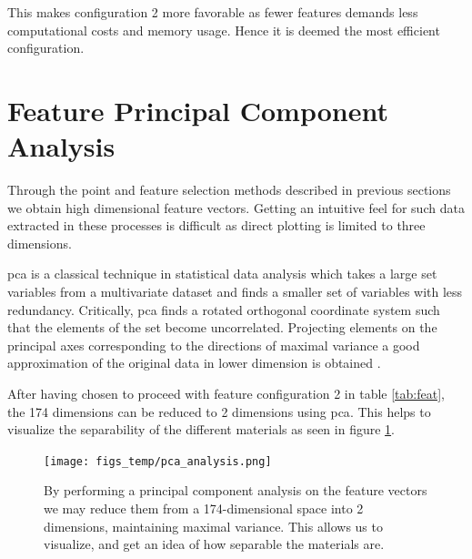 This makes configuration 2 more favorable as fewer features demands less computational costs and memory usage. Hence it is deemed the most efficient configuration.


\section{Feature Principal Component Analysis}

Through the point and feature selection methods described in previous sections we obtain high dimensional feature vectors. Getting an intuitive feel for such data extracted in these processes is difficult as direct plotting is limited to three dimensions. 

\gls{pca} is  a classical technique in statistical data analysis which takes a large set variables from a multivariate dataset and finds a smaller set of variables with less redundancy. Critically, \gls{pca} finds a rotated orthogonal coordinate system such that the elements of the set become uncorrelated. Projecting elements on the principal axes corresponding to the directions of maximal variance a good approximation of the original data in lower dimension is obtained \citep{hyvasrinen_karhunen_oja_2004}.

After having chosen to proceed with feature configuration 2 in table \ref{tab:feat}, the 174 dimensions can be reduced to 2 dimensions using \gls{pca}. This helps to visualize the separability of the different materials as seen in figure \ref{fig:pca}.

\begin{figure}[h]
	\centering
	\texttt{[image: figs\_temp/pca\_analysis.png]}
	\caption{By performing a principal component analysis on the feature vectors we may reduce them from a 174-dimensional space into 2 dimensions, maintaining maximal variance. This allows us to visualize, and get an idea of how separable the materials are.}
	\label{fig:pca}
\end{figure}

